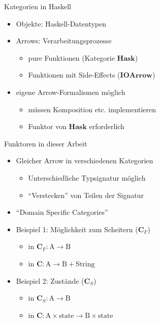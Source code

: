 \documentclass{beamer}
\newcommand{\pfeil}{\item[$\Rightarrow$]}
\newcommand\ato{\rightarrow} %
\begin{document}
\begin{frame}{Kategorien in Haskell}
  \begin{itemize}
  \item Objekte: Haskell-Datentypen 
  \item Arrows: Verarbeitungsprozesse
    \begin{itemize}
    \item pure Funktionen (Kategorie $\mathbf{Hask}$)
    \item Funktionen mit Side-Effects ($\mathbf{IOArrow}$)
    \end{itemize}
  \item eigene Arrow-Formalismen möglich
    \begin{itemize}
    \item müssen Komposition etc. implementieren
    \item Funktor von $\mathbf{Hask}$ erforderlich
    \end{itemize}
  \end{itemize}
\end{frame}

\begin{frame}{Funktoren in dieser Arbeit}
  \begin{itemize}
  \item Gleicher Arrow in verschiedenen Kategorien
    \begin{itemize}
    \item Unterschiedliche Typsignatur möglich
      \pfeil ``Verstecken'' von Teilen der Signatur
    \end{itemize}
  \item ``Domain Specific Categories''
  \item Beispiel 1: Möglichkeit zum Scheitern ($\mathbf{C}_F$)
    \begin{itemize}
    \item in $\mathbf{C}_F: \mathrm{A} \ato \mathrm{B}$
    \item in $\mathbf{C}: \mathrm{A} \ato \mathrm{B} + \mathrm{String}$
    \end{itemize}
  \item Beispiel 2: Zustände ($\mathbf{C}_S$)
    \begin{itemize}
    \item in $\mathbf{C}_S: \mathrm{A} \ato \mathrm{B}$
    \item in $\mathbf{C}: \mathrm{A} \times \mathrm{state} \ato \mathrm{B} \times \mathrm{state}$
    \end{itemize}
  \end{itemize}
\end{frame}
\end{document}
